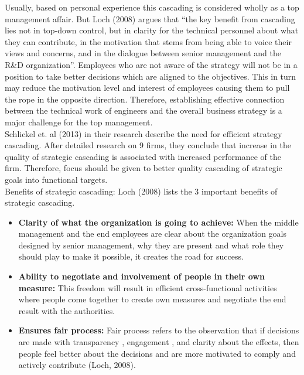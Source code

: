 Usually, based on personal experience this cascading is considered wholly as a top management affair. But Loch (2008) argues that “the key benefit from cascading lies not in top-down control, but in clarity for the technical personnel about what they can contribute, in the motivation that stems from being able to voice their views and concerns, and in the dialogue between senior management and the R&D organization”. Employees who are not aware of the strategy will not be in a position to take better decisions which are aligned to the objectives. This in turn may reduce the motivation level and interest of employees causing them to pull the rope in the opposite direction. Therefore, establishing effective connection between the technical work of engineers and the overall business strategy is a major challenge for the top management.\\

Schlickel et. al (2013) in their research describe the need for efficient strategy cascading. After detailed research on 9 firms, they conclude that increase in the quality of strategic cascading is associated with increased performance of the firm. Therefore, focus should be given to better quality cascading of strategic goals into functional targets.\\

Benefits of strategic cascading:
Loch (2008) lists the 3 important benefits of strategic cascading.\\

\begin{itemize}
    \item \textbf{Clarity of what the organization is going to achieve:} 
    When the middle management and the end employees are clear about the organization goals designed by senior management, why they are present and what role they should play to make it possible, it creates the road for success.\\
    \item \textbf{Ability to negotiate and involvement of people in their own measure:}
    This freedom will result in efficient cross-functional activities where people come together to create own measures and negotiate the end result with the authorities.\\
    \item \textbf{Ensures fair process:} 
    Fair process refers to the observation that if decisions are made with transparency , engagement , and clarity about the effects, then people feel better about the decisions and are more motivated to comply and actively contribute (Loch, 2008).\\
\end{itemize}

